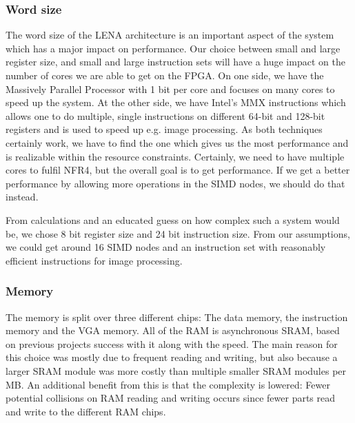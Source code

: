 \subsubsection{Word size}

The word size of the \ac{LENA} architecture is an important aspect of the system which
has a major impact on performance. Our choice between small and large
register size, and
small and large instruction sets will have a huge impact on the number of cores
we are able to get on the \ac{FPGA}. On one side, we have the Massively Parallel
Processor\cite{potter1985mpp} with 1 bit per core and focuses on many cores to
speed up the system. At the other side, we have Intel's MMX instructions which
allows one to do multiple, single instructions on different 64-bit and 128-bit
registers and is used to speed up e.g. image processing\cite{lee2004h264}. As
both techniques certainly work, we have to find the one which gives us the most
performance and is realizable within the resource constraints. Certainly, we
need to have multiple cores to fulfil NFR4, but the overall goal is to get
performance. If we get a better performance by allowing more operations in the
\ac{SIMD} nodes, we should do that instead.

From calculations and an educated guess
on how complex such a system would be, we chose 8 bit register size and 24 bit instruction
size. From our assumptions, we could get around 16 \ac{SIMD} nodes and an
instruction set with reasonably efficient instructions for image processing.

\subsubsection{Memory}
 The memory is split over three
different chips: The data memory, the instruction memory and the \ac{VGA}
memory. All of the \ac{RAM} is asynchronous \ac{SRAM}, based on previous
projects success with it\cite{berg2011festinalente} along with the speed. The
main reason for this choice was mostly due to frequent reading and writing, but
also because a larger \ac{SRAM} module was more costly than multiple smaller
\ac{SRAM} modules per \ac{MB}. An additional benefit from this is that the
complexity is lowered: Fewer potential collisions on \ac{RAM} reading and
writing occurs since fewer parts read and write to the different \ac{RAM} chips.

